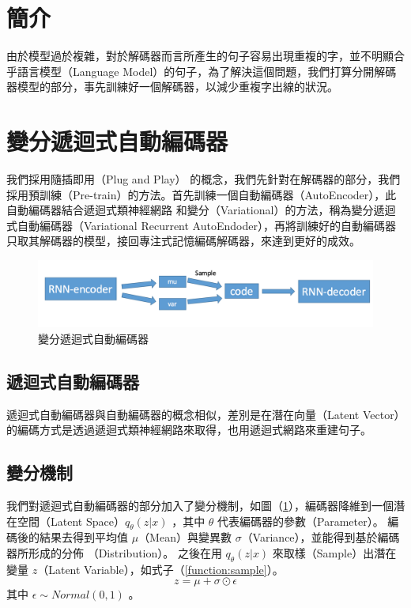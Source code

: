 \section{簡介}
由於模型過於複雜，對於解碼器而言所產生的句子容易出現重複的字，並不明顯合乎語言模型（Language Model）的句子，為了解決這個問題，我們打算分開解碼器模型的部分，事先訓練好一個解碼器，以減少重複字出線的狀況。
\section{變分遞迴式自動編碼器}
我們採用隨插即用（Plug and Play）\cite{nguyen2016plug} 的概念，我們先針對在解碼器的部分，我們採用預訓練（Pre-train）的方法。首先訓練一個自動編碼器（AutoEncoder），此自動編碼器結合遞迴式類神經網路 \cite{bowman2015generating} 和變分（Variational）的方法，稱為變分遞迴式自動編碼器（Variational Recurrent AutoEndoder），再將訓練好的自動編碼器只取其解碼器的模型，接回專注式記憶編碼解碼器，來達到更好的成效。
\begin{figure}[h]
    \centering
    \includegraphics[scale=0.52]{images/chap5_vrae.png}
    \caption{變分遞迴式自動編碼器}\label{fig:vrae}
\end{figure}
\subsection{遞迴式自動編碼器}
遞迴式自動編碼器與自動編碼器的概念相似，差別是在潛在向量（Latent Vector）的編碼方式是透過遞迴式類神經網路來取得，也用遞迴式網路來重建句子。
\subsection{變分機制}
我們對遞迴式自動編碼器的部分加入了變分機制，如圖（\ref{fig:vrae}），編碼器降維到一個潛在空間（Latent Space）$q_\theta(z|x)$ ，其中 $\theta$ 代表編碼器的參數（Parameter）。 編碼後的結果去得到平均值 $\mu$（Mean）與變異數 $\sigma$（Variance），並能得到基於編碼器所形成的分佈 （Distribution）。
之後在用 $q_\theta(z|x)$ 來取樣（Sample）出潛在變量 $z$（Latent Variable），如式子（\ref{function:sample}）。
\begin{equation}
    z = \mu + \sigma \odot \epsilon \label{function:sample}
\end{equation}
其中 $\epsilon \sim Normal(0,1)$ 。

